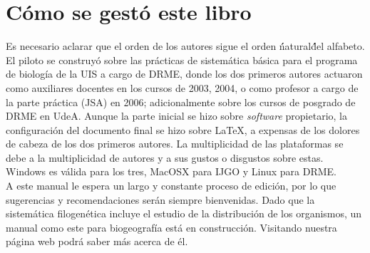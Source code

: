 \section*{C\'omo se gest\'o este libro}
Es necesario aclarar que el orden de los autores sigue el orden \'\'natural\'\' del alfabeto. El piloto se construy\'o sobre las pr\'acticas de sistem\'atica b\'asica para el programa de biolog\'ia de la UIS a cargo de DRME, donde los dos primeros autores actuaron como auxiliares docentes en los cursos de 2003, 2004, o como profesor a cargo de la parte pr\'actica (JSA) en 2006; adicionalmente sobre los cursos de posgrado de DRME en UdeA. Aunque la parte inicial se hizo sobre \textit{software} propietario, la configuraci\'on del documento final se hizo sobre \LaTeX, a expensas de los dolores de cabeza de los dos primeros autores. La multiplicidad de las plataformas se debe a la multiplicidad de autores y a sus gustos o disgustos sobre estas. Windows es v\'alida para los tres, MacOSX para IJGO y Linux para DRME.\\
A este manual le espera un largo y constante proceso de edici\'on, por lo que sugerencias y recomendaciones ser\'an siempre bienvenidas. Dado que la sistem\'atica filogen\'etica incluye el estudio de la distribuci\'on de los organismos, un manual como este para biogeograf\'ia est\'a en construcci\'on. Visitando nuestra p\'agina web podr\'a saber m\'as acerca de \'el.
